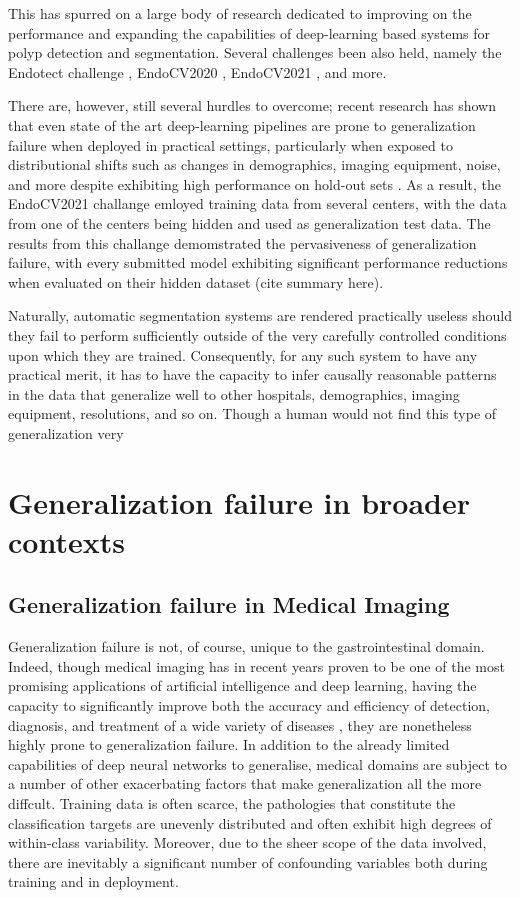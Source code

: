 	This has spurred on a large body of research dedicated to improving on the performance and expanding the capabilities of deep-learning based systems for polyp detection and segmentation. Several challenges been also held, namely the Endotect challenge \cite{endotect}, EndoCV2020 \cite{endocv2020}, EndoCV2021 \cite{endocv2021}, and more.
	
	There are, however, still several hurdles to overcome; recent research has shown that even state of the art deep-learning pipelines are prone to generalization failure when deployed in practical settings, particularly when exposed to distributional shifts such as changes in demographics, imaging equipment, noise, and more despite exhibiting high performance on hold-out sets \cite{retinopathy, damour2020underspecification, pneumonia, shortcut_learning}. As a result, the EndoCV2021 challange emloyed training data from several centers, with the data from one of the centers being hidden and used as generalization test data. The results from this challange demomstrated the pervasiveness of generalization failure, with every submitted model exhibiting significant performance reductions when evaluated on their hidden dataset (cite summary here). 
	
	Naturally, automatic segmentation systems are rendered practically useless should they fail to perform sufficiently outside of the very carefully controlled conditions upon which they are trained. Consequently, for any such system to have any practical merit, it has to have the capacity to infer causally reasonable patterns in the data that generalize well to other hospitals, demographics, imaging equipment, resolutions, and so on. Though a human would not find this type of generalization very 

\section{Generalization failure in broader contexts} \label{case_studies}
	\subsection{Generalization failure in Medical Imaging}
	Generalization failure is not, of course, unique to the gastrointestinal domain. Indeed, though medical imaging has in recent years proven to be one of the most promising applications of artificial intelligence and deep learning, having the capacity to significantly improve both the accuracy and efficiency of detection, diagnosis, and treatment of a wide variety of diseases \cite{dl_medical_imaging}, they are nonetheless highly prone to generalization failure. In addition to the already limited capabilities of deep neural networks to generalise, medical domains are subject to a number of other exacerbating factors that make generalization all the more diffcult. Training data is often scarce, the pathologies that constitute the classification targets are unevenly distributed and often exhibit high degrees of within-class variability. Moreover, due to the sheer scope of the data involved, there are inevitably a significant number of confounding variables both during training and in deployment.  
		
